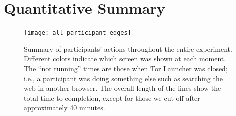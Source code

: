 \documentclass[USenglish,oneside,twocolumn]{article}
\begin{document}
\section{Quantitative Summary}
\label{all-participant-edges} 
\begin{figure}
\centering
\texttt{[image: all-participant-edges]}
\caption{
Summary of participants' actions throughout the entire experiment.
Different colors indicate which screen was shown at each moment.
The ``not running'' times are those when Tor Launcher was closed;
i.e., a participant was doing something else
such as searching the web in another browser.
The overall length of the lines show the total time to completion,
except for those we cut off after approximately 40 minutes.
}
\label{fig:all-participant-edges}
\end{figure}
\end{document}
